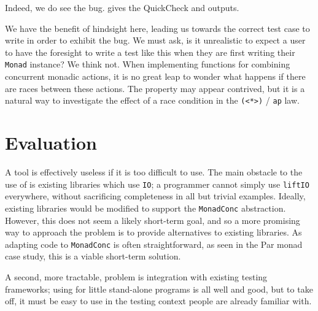 Indeed, we do see the bug.   gives the QuickCheck and
\dejafu{} outputs.

We have the benefit of hindsight here, leading us towards the correct
test case to write in order to exhibit the bug.  We must ask, is it
unrealistic to expect a user to have the foresight to write a test
like this when they are first writing their \verb|Monad| instance?  We
think not.  When implementing functions for combining concurrent
monadic actions, it is no great leap to wonder what happens if there
are races between these actions.  The property may appear contrived,
but it is a natural way to investigate the effect of a race condition
in the \verb|(<*>)| / \verb|ap| law.

\section{Evaluation}
\label{sec:dejafu-evaluation}

A tool is effectively useless if it is too difficult to use.  The main
obstacle to the use of \dejafu{} is existing libraries which use
\verb|IO|; a programmer cannot simply use \verb|liftIO| everywhere,
without sacrificing completeness in all but trivial examples.
Ideally, existing libraries would be modified to support the
\verb|MonadConc| abstraction.  However, this does not seem a likely
short-term goal, and so a more promising way to approach the problem
is to provide alternatives to existing libraries.  As adapting code to
\verb|MonadConc| is often straightforward, as seen in the Par monad
case study, this is a viable short-term solution.

A second, more tractable, problem is integration with existing testing
frameworks; using \dejafu{} for little stand-alone programs is all
well and good, but to take off, it must be easy to use in the testing
context people are already familiar with.

